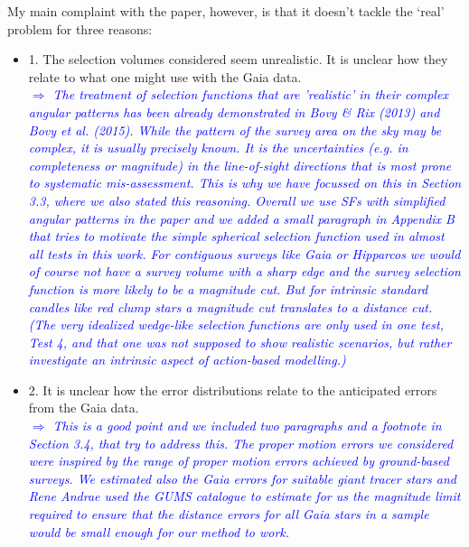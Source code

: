 \documentclass[10pt,a4paper]{article}
\newcommand{\Comment}[1]{\textsl{\textcolor{Blue}{$\Longrightarrow$ {#1}}}}
\begin{document}
My main complaint with the paper, however, is that it doesn't tackle the `real'
problem for three reasons:
\begin{itemize}
\item 1. The selection volumes considered seem unrealistic. It is unclear how they relate to what one might use with the Gaia data. \\\Comment{The treatment of selection functions that are 'realistic' in their complex angular patterns has been already demonstrated in Bovy \& Rix (2013) and Bovy et al. (2015). While the pattern of the survey area on the sky may be complex, it is usually precisely known. It is the uncertainties (e.g. in completeness or magnitude) in the line-of-sight directions that is most prone to systematic mis-assessment. This is why we have focussed on this in Section 3.3, where we also stated this reasoning. Overall we use SFs with simplified angular patterns in the paper and we added a small paragraph in Appendix B that tries to motivate the simple spherical selection function used in almost all tests in this work. For contiguous surveys like Gaia or Hipparcos we would of course not have a survey volume with a sharp edge and the survey selection function is more likely to be a magnitude cut. But for intrinsic standard candles like red clump stars a magnitude cut translates to a distance cut. (The very idealized wedge-like selection functions are only used in one test, Test 4, and that one was not supposed to show realistic scenarios, but rather investigate an intrinsic aspect of action-based modelling.)}\\
\item 2. It is unclear how the error distributions relate to the anticipated errors from the Gaia data. \\\Comment{This is a good point and we included two paragraphs and a footnote in Section 3.4, that try to address this. The proper motion errors we considered were inspired by the range of proper motion errors achieved by ground-based surveys. We estimated also the Gaia errors for suitable giant tracer stars and Rene Andrae used the GUMS catalogue to estimate for us the magnitude limit required to ensure that the distance errors for all Gaia stars in a sample would be small enough for our method to work.}

\end{itemize}
\end{document}
